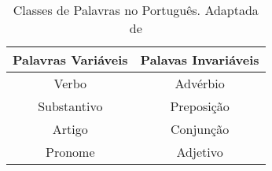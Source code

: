 \begin{table}[h!]
    \centering
    \begin{tabular}{|c|c|}
        \hline
        Palavras Variáveis & Palavas Invariáveis\\\hline
        Verbo & Advérbio\\\hline
        Substantivo & Preposição\\\hline
        Artigo & Conjunção\\\hline
        Pronome & Adjetivo\\\hline
    \end{tabular}
    \caption[Classes de Palavras no Português]{Classes de Palavras no Português. Adaptada de }
    \label{tab:classesPalavras}
\end{table}